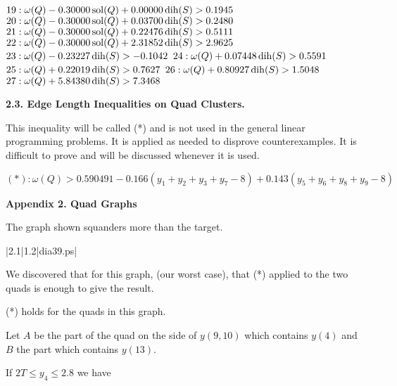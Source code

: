 $19:  \omega(Q) - 0.30000 \operatorname{sol}(Q) + 0.00000 \operatorname{dih}(S) > 0.1945$\newline
$20:  \omega(Q) - 0.30000 \operatorname{sol}(Q) + 0.03700 \operatorname{dih}(S) > 0.2480$\newline
$21:  \omega(Q) - 0.30000 \operatorname{sol}(Q) + 0.22476 \operatorname{dih}(S) > 0.5111$\newline
$22:  \omega(Q) - 0.30000 \operatorname{sol}(Q) + 2.31852 \operatorname{dih}(S) > 2.9625$\newline
$23:  \omega(Q) - 0.23227 \operatorname{dih}(S) > -0.1042$\newline
$24:  \omega(Q) + 0.07448 \operatorname{dih}(S) > 0.5591$\newline
$25:  \omega(Q) + 0.22019 \operatorname{dih}(S) > 0.7627$\newline
$26:  \omega(Q) + 0.80927 \operatorname{dih}(S) > 1.5048$\newline
$27:  \omega(Q) + 5.84380 \operatorname{dih}(S) > 7.3468$\newline



\smallskip

{\bf 2.3. Edge Length Inequalities on Quad Clusters.}

This inequality will be called (*) and is not used in the general linear programming problems.  It is applied as needed to disprove counterexamples.  It is 
difficult to prove and will be discussed whenever it is used.

\smallskip

$(*): \omega(Q) > 0.590491 -0.166(y_1+y_2+y_3+y_7-8) + 0.143 (y_5+y_6+y_8+y_9-8)$\newline

\smallskip

\bigskip



\bigskip

\centerline{\bf Appendix 2. Quad Graphs}


\bigskip

 The graph shown 
squanders more than the target.  \endproclaim


\gram|2.1|1.2|dia39.ps|  %


We discovered that for this graph, (our worst case), that (*) applied 
to the two quads is enough to give the result.

 (*) holds for the quads in this graph. \endproclaim

Let $A$ be the part of the quad on the side of $y(9,10)$ which contains $y(4)$ and $B$ the part which contains $y(13)$.


If $2T\le y_4 \le 2.8$ we have

